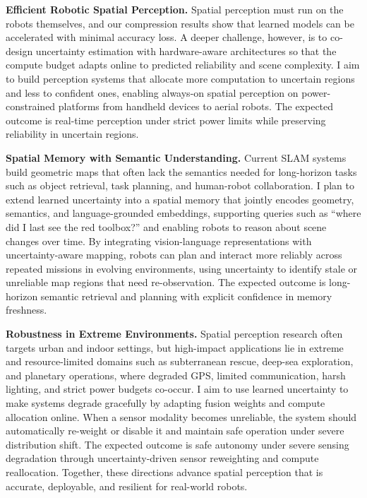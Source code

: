 \documentclass[conference]{IEEEtran}
\begin{document}
\textbf{Efficient Robotic Spatial Perception.}
Spatial perception must run on the robots themselves, and our compression results show that learned models can be accelerated with minimal accuracy loss.
A deeper challenge, however, is to co-design uncertainty estimation with hardware-aware architectures so that the compute budget adapts online to predicted reliability and scene complexity.
I aim to build perception systems that allocate more computation to uncertain regions and less to confident ones, enabling always-on spatial perception on power-constrained platforms from handheld devices to aerial robots.
The expected outcome is real-time perception under strict power limits while preserving reliability in uncertain regions.

\textbf{Spatial Memory with Semantic Understanding.}
Current SLAM systems build geometric maps that often lack the semantics needed for long-horizon tasks such as object retrieval, task planning, and human-robot collaboration.
I plan to extend learned uncertainty into a spatial memory that jointly encodes geometry, semantics, and language-grounded embeddings, supporting queries such as ``where did I last see the red toolbox?'' and enabling robots to reason about scene changes over time.
By integrating vision-language representations with uncertainty-aware mapping, robots can plan and interact more reliably across repeated missions in evolving environments, using uncertainty to identify stale or unreliable map regions that need re-observation.
The expected outcome is long-horizon semantic retrieval and planning with explicit confidence in memory freshness.

\textbf{Robustness in Extreme Environments.}
Spatial perception research often targets urban and indoor settings, but high-impact applications lie in extreme and resource-limited domains such as subterranean rescue, deep-sea exploration, and planetary operations, where degraded GPS, limited communication, harsh lighting, and strict power budgets co-occur.
I aim to use learned uncertainty to make systems degrade gracefully by adapting fusion weights and compute allocation online.
When a sensor modality becomes unreliable, the system should automatically re-weight or disable it and maintain safe operation under severe distribution shift.
The expected outcome is safe autonomy under severe sensing degradation through uncertainty-driven sensor reweighting and compute reallocation.
Together, these directions advance spatial perception that is accurate, deployable, and resilient for real-world robots.



\end{document}
